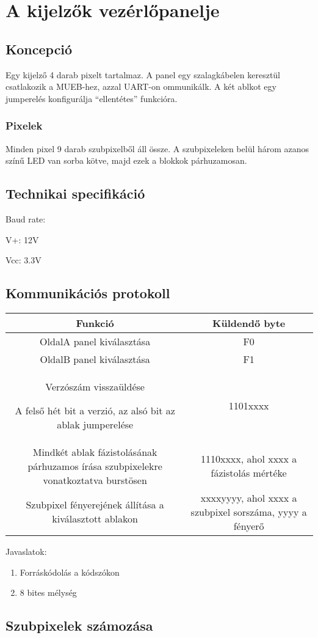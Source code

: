 \chapter{A kijelzők vezérlőpanelje}

\section{Koncepció}
Egy kijelző 4 darab pixelt tartalmaz. A panel egy szalagkábelen keresztül csatlakozik a MUEB-hez, azzal UART-on ommunikálk.
A két ablkot egy jumperelés konfigurálja ``ellentétes'' funkcióra.

\subsection{Pixelek}
Minden pixel 9 darab szubpixelből áll össze. A szubpixeleken belül három azanos színű LED van sorba kötve, majd ezek a blokkok párhuzamosan.

\section{Technikai specifikáció} %
Baud rate: %
\par
V+: 12V
\par
Vcc: 3.3V

\section{Kommunikációs protokoll}
\begin{center}
  \begin{tabular}{ c c }
    Funkció & Küldendő byte \\ \hline \hline
    OldalA panel kiválasztása & F0 \\ \hline
    OldalB panel kiválasztása & F1 \\ \hline
    Verzószám visszaüldése \par A felső hét bit a verzió, az alsó bit az ablak jumperelése & 1101xxxx \\ \hline
    Mindkét ablak fázistolásának párhuzamos írása szubpixelekre vonatkoztatva burstösen & 1110xxxx, ahol xxxx a fázistolás mértéke  \\ \hline
    Szubpixel fényerejének állítása a kiválasztott ablakon & xxxxyyyy, ahol xxxx  a szubpixel sorszáma, yyyy a fényerő \\ \hline
  \end{tabular}
\end{center}

Javaslatok:
\begin{enumerate}
 \item Forráskódolás a kódszókon
 \item 8 bites mélység
\end{enumerate}

\section{Szubpixelek számozása}
